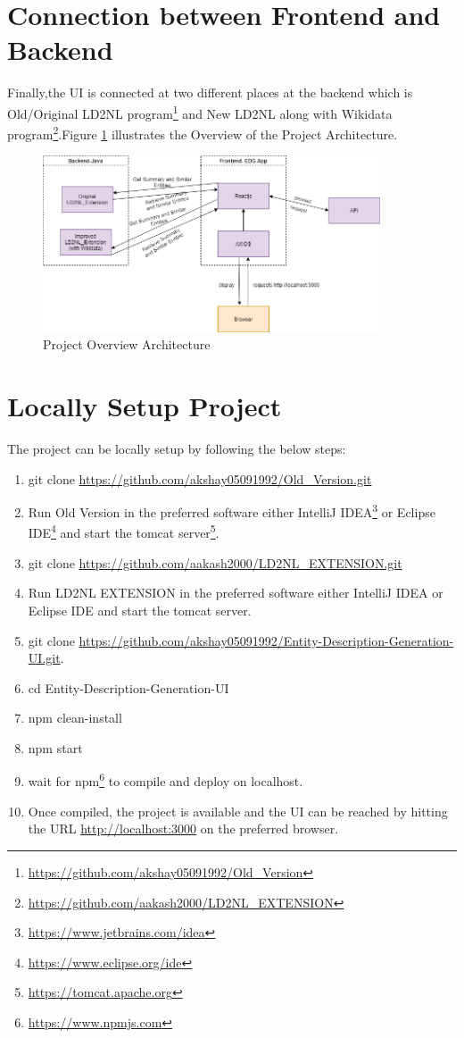 \documentclass[head,11pt]{llncs}
\begin{document}
\section{Connection between Frontend and Backend}
Finally,the UI is connected at two different places at the backend which is Old/Original LD2NL program\footnote{\url{https://github.com/akshay05091992/Old_Version}} and New LD2NL along with Wikidata program\footnote{\url{https://github.com/aakash2000/LD2NL_EXTENSION}}.Figure \ref{fig:pgov} illustrates the Overview of the Project Architecture.

\begin{figure}
\centering
\includegraphics[width=100mm]{figures/pg overview.png}
\caption{Project Overview Architecture}
\label{fig:pgov}
\end{figure}

\newpage
\section{Locally Setup Project}
The project can be locally setup by following the below steps:
\begin{enumerate}
\item git clone \url{https://github.com/akshay05091992/Old_Version.git}
\item Run Old Version in the preferred software either IntelliJ IDEA\footnote{\url{https://www.jetbrains.com/idea}} or Eclipse IDE\footnote{\url{https://www.eclipse.org/ide}} and start the tomcat server\footnote{\url{https://tomcat.apache.org}}.
\item git clone \url{https://github.com/aakash2000/LD2NL_EXTENSION.git}
\item  Run LD2NL EXTENSION in the preferred software either IntelliJ IDEA or Eclipse IDE and start the tomcat server.
\item git clone \url{https://github.com/akshay05091992/Entity-Description-Generation-UI.git}.
\item cd Entity-Description-Generation-UI
\item npm clean-install
\item npm start
\item wait for npm\footnote{\url{https://www.npmjs.com}} to compile and deploy on localhost.
\item Once compiled, the project is available and the UI can be reached by hitting the URL \url{http://localhost:3000} on the preferred browser.


\end{enumerate}
\end{document}

